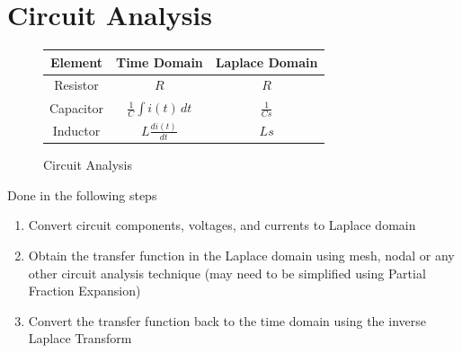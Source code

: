 \documentclass[oneside]{book}
\begin{document}
            \section{Circuit Analysis}
                \begin{figure}[H]
                    \centering
                    \begin{tabular}{|c|c|c|}
                        \hline
                        Element & Time Domain & Laplace Domain \\
                        \hline
                        Resistor & $R$ & $R$ \\
                        \hline
                        Capacitor & $\frac{1}{C} \int i(t) \, dt$ & $\frac{1}{Cs}$ \\
                        \hline
                        Inductor & $L \frac{di(t)}{dt}$ & $Ls$ \\
                        \hline
                    \end{tabular}
                    \caption{Circuit Analysis}
                \end{figure}
                Done in the following steps
                \begin{enumerate}
                    \item Convert circuit components, voltages, and currents to Laplace domain
                    \item Obtain the transfer function in the Laplace domain using mesh, nodal or any other circuit analysis technique (may need
                    to be simplified using Partial Fraction Expansion)
                    \item Convert the transfer function back to the time domain using the inverse Laplace Transform
                \end{enumerate}
\end{document}
